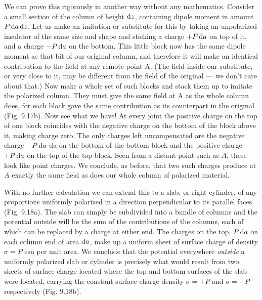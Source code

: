 We can prove this rigorously in another way without any 
mathematics. Consider a small section of the column of height $\operatorname{d\!} z$, containing
dipole moment in amount $P\operatorname{d\!} a\operatorname{d\!} z$. Let us make an 
imitation or substitute for this by taking an unpolarized insulator of the
same size and shape and sticking a charge $+P\operatorname{d\!} a$ on top of it, and a
charge $-P\operatorname{d\!} a$  on the bottom. This little block now has the same
dipole moment as that bit of our original column, and therefore it
will make an identical contribution to the field at any remote point A.
(The field inside our substitute, or very close to it, may be different
from the field of the original --- we don't care about that.) Now make
a whole set of such blocks and stack them up to imitate the polarized
column. They must give the same field at A as the whole column
does, for each block gave the same contribution as its counterpart
in the original (Fig. 9.17b). Now see what we have! At every joint
the positive charge on the top of one block coincides with the negative
charge on the bottom of the block above it, making charge zero.
The only charges left uncompensated are the negative charge $-P\operatorname{d\!} a$ da
on the bottom of the bottom block and the positive charge $+P\operatorname{d\!} a$ on
the top of the top block. Seen from a distant point such as $A$, these
look like point charges. We conclude, as before, that two such
charges produce at $A$ exactly the same field as does our whole column
of polarized material.

With no further calculation we can extend this to a slab, or right
cylinder, of any proportions uniformly polarized in a direction perpendicular
to its parallel faces (Fig. 9.18a). The slab can simply be
subdivided into a bundle of columns and the potential outside will
be the sum of the contributions of the columns, each of which can
be replaced by a charge at either end. The charges on the top, $P\operatorname{d\!} a$
on each column end of area $\operatorname{d\!} a$, make up a uniform sheet of surface
charge of density $\sigma=P$ esu per unit area. We conclude that the
potential everywhere \emph{outside} a uniformly polarized slab or cylinder
is precisely what would result from two sheets of surface charge
located where the top and bottom surfaces of the slab were located,
carrying the constant surface charge density $\sigma=+P$ and $\sigma=-P$
respectively (Fig. 9.18b).

